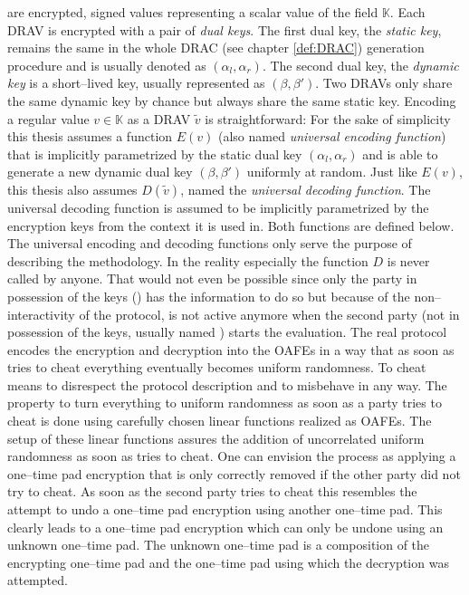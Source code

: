  are encrypted, signed values
representing a scalar value of the field $\mathbb{K}$. Each DRAV is encrypted
with a pair of \emph{dual keys}. The first dual key, the \emph{static key},
remains the same in the whole DRAC (see chapter \ref{def:DRAC}) generation
procedure and is usually denoted as $(\alpha_l, \alpha_r)$. The second dual key,
the \emph{dynamic key} is a short--lived key, usually represented as $(\beta,
\beta')$. Two DRAVs only share the same dynamic key by chance but always share
the same static key. Encoding a regular value $v \in \mathbb{K}$ as a DRAV
$\widetilde{v}$ is straightforward: For the sake of simplicity this thesis
assumes a function $E(v)$ (also named \emph{universal encoding function}) that
is implicitly parametrized by the static dual key $(\alpha_l, \alpha_r)$ and is
able to generate a new dynamic dual key $(\beta, \beta')$ uniformly at random.
Just like $E(v)$, this thesis also assumes $D(\widetilde{v})$, named the
\emph{universal decoding function}. The universal decoding function is assumed
to be implicitly parametrized by the encryption keys from the context it is used
in. Both functions are defined below.  The universal encoding and decoding
functions only serve the purpose of describing the methodology. In the reality
especially the function $D$ is never called by anyone. That would not even be
possible since only the party in possession of the keys (\JWpOne{}) has the
information to do so but because of the non--interactivity of the protocol,
\JWpOne{} is not active anymore when the second party (not in possession of the
keys, usually named \JWpTwo{}) starts the evaluation. The real protocol encodes
the encryption and decryption into the OAFEs in a way that as soon as \JWpTwo{}
tries to cheat everything eventually becomes uniform randomness. To cheat means
to disrespect the protocol description and to misbehave in any way. The property
to turn everything to uniform randomness as soon as a party tries to cheat is
done using carefully chosen linear functions realized as OAFEs. The setup of
these linear functions assures the addition of uncorrelated uniform randomness
as soon as \JWpTwo{} tries to cheat. One can envision the process as applying a
one--time pad encryption that is only correctly removed if the other party did
not try to cheat. As soon as the second party tries to cheat this resembles the
attempt to undo a one--time pad encryption using another one--time pad. This
clearly leads to a one--time pad encryption which can only be undone using an
unknown one--time pad. The unknown one--time pad is a composition of the
encrypting one--time pad and the one--time pad using which the decryption was
attempted.


